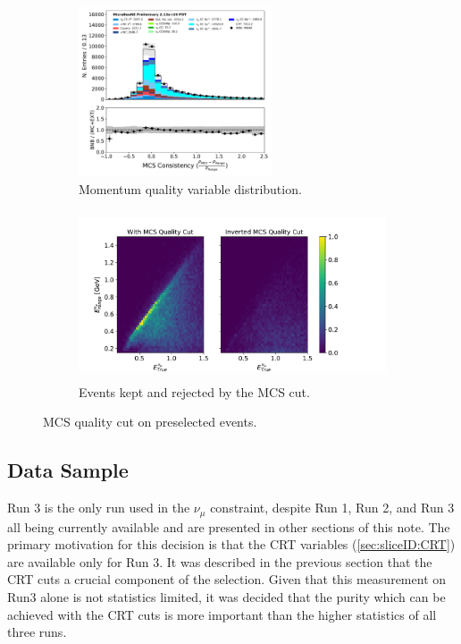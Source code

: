 \begin{figure}[hbt!] 
\begin{center}
    \begin{subfigure}[b]{0.45\textwidth}
    \centering
    \includegraphics[height=5cm]{NuMuCCsel/Images/Ryan/appendix_muonsel_input_R3/trk_p_quality_v_07232020_presel_samples_detsys_event_category.pdf}
    \caption{\label{fig:NuMUCCsel:ryan:MCSqualitydistrib} Momentum quality variable distribution.}
    \end{subfigure}
    \begin{subfigure}[b]{0.45\textwidth}
    \centering
    \includegraphics[height=5cm]{NuMuCCsel/Images/Ryan/other/EnergyRes_03202020_subplots.pdf}
    \caption{\label{fig:NuMUCCsel:ryan:MCSqualityeres} Events kept and rejected by the MCS cut.}
    \end{subfigure} \newline
\caption{MCS quality cut on preselected events.}
\label{fig:numusel:momres}
\end{center}
\end{figure}

\subsection{Data Sample}
\label{ssec:NuMUCCsel:datasample}

\par Run 3 is the only run used in the $\nu_{\mu}$ constraint, despite Run 1, Run 2, and Run 3 all being currently available and are presented in other sections of this note. The primary motivation for this decision is that the CRT variables (\cref{sec:sliceID:CRT}) are available only for Run 3. It was described in the previous section that the CRT cuts a crucial component of the selection. Given that this measurement on Run3 alone is not statistics limited, it was decided that the purity which can be achieved with the CRT cuts is more important than the higher statistics of all three runs. 


